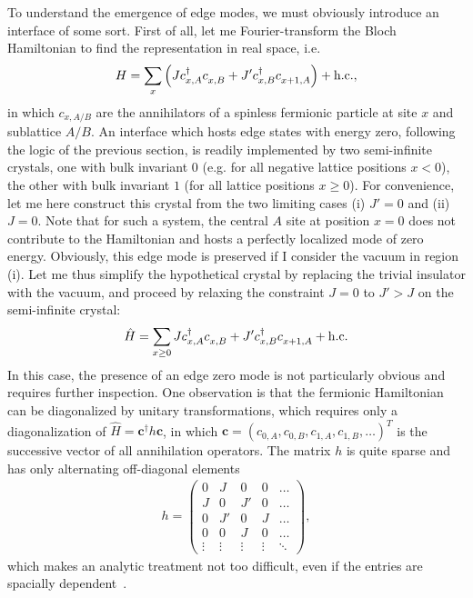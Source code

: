 To understand the emergence of edge modes, we must obviously introduce an interface of some sort.
First of all, let me Fourier-transform the Bloch Hamiltonian to find the representation in real space, i.e.
\begin{align}
    H = \sum_x \brlr{J c^\dag_{x,A}c^\pdag_{x,B} + J' c^\dag_{x,B}c^\pdag_{x+1,A}} + \hc,
\end{align}
in which $c_{x,A/B}$ are the annihilators of a spinless fermionic particle at site $x$ and sublattice $A/B$.
An interface which hosts edge states with energy zero, following the logic of the previous section, is readily implemented by two semi-infinite crystals, one with bulk invariant $0$ (e.g. for all negative lattice positions $x<0$), the other with bulk invariant $1$ (for all lattice positions $x\geq0$).
For convenience, let me here construct this crystal from the two limiting cases (i) $J'=0$ and (ii) $J=0$.
Note that for such a system, the central $A$ site at position $x=0$ does not contribute to the Hamiltonian and hosts a perfectly localized mode of zero energy.
Obviously, this edge mode is preserved if I consider the vacuum in region (i).
Let me thus simplify the hypothetical crystal by replacing the trivial insulator with the vacuum, and proceed by relaxing the constraint $J=0$ to $J'>J$ on the semi-infinite crystal:
\begin{align}
    \hat H = \sum_{x\geq0} J c^\dag_{x,A}c^\pdag_{x,B} + J' c^\dag_{x,B}c^\pdag_{x+1,A} + \hc
\end{align}
In this case, the presence of an edge zero mode is not particularly obvious and requires further inspection.
One observation is that the fermionic Hamiltonian can be diagonalized by unitary transformations, which requires only a diagonalization of $\hat H = \bm c^\dag h \bm c$, in which $\bm c=(c_{0,A},c_{0,B},c_{1,A},c_{1,B},\dots)^T$ is the successive vector of all annihilation operators.
The matrix $h$ is quite sparse and has only alternating off-diagonal elements
\begin{align}
    h =
    \begin{pmatrix}
        0 & J & 0 & 0 &\dots \\
        J & 0 & J' & 0 & \dots \\
        0 & J' & 0 & J & \dots \\
        0 & 0 & J & 0 & \dots \\
        \vdots & \vdots & \vdots & \vdots & \ddots
    \end{pmatrix},
\end{align}
which makes an analytic treatment not too difficult, even if the entries are spacially dependent~\cite{Asboth2016}.
